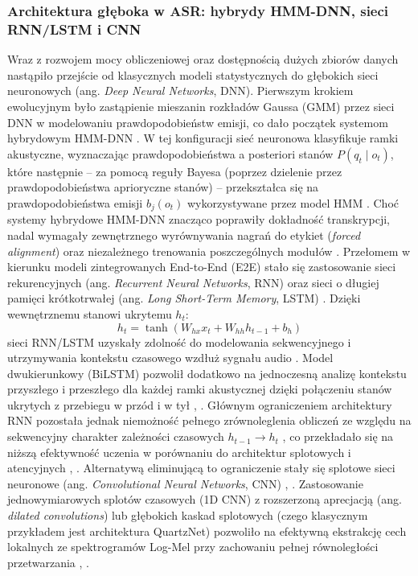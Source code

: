 \subsubsection{Architektura głęboka w ASR: hybrydy HMM-DNN, sieci RNN/LSTM i CNN}
Wraz z rozwojem mocy obliczeniowej oraz dostępnością dużych zbiorów danych nastąpiło przejście od klasycznych modeli statystycznych do głębokich sieci neuronowych (ang. \textit{Deep Neural Networks}, DNN). Pierwszym krokiem ewolucyjnym było zastąpienie mieszanin rozkładów Gaussa (GMM) przez sieci DNN w modelowaniu prawdopodobieństw emisji, co dało początek systemom hybrydowym HMM-DNN \cite[s.~20]{pudo2024optimizing}. W tej konfiguracji sieć neuronowa klasyfikuje ramki akustyczne, wyznaczając prawdopodobieństwa a posteriori stanów $P(q_t \mid o_t)$, które następnie – za pomocą reguły Bayesa (poprzez dzielenie przez prawdopodobieństwa aprioryczne stanów) – przekształca się na prawdopodobieństwa emisji $b_j(o_t)$ wykorzystywane przez model HMM \cite[s.~1, 1765]{graves2014towards}. Choć systemy hybrydowe HMM-DNN znacząco poprawiły dokładność transkrypcji, nadal wymagały zewnętrznego wyrównywania nagrań do etykiet (\textit{forced alignment}) oraz niezależnego trenowania poszczególnych modułów \cite[s.~316]{pondel2024e2e}. Przełomem w kierunku modeli zintegrowanych End-to-End (E2E) stało się zastosowanie sieci rekurencyjnych (ang. \textit{Recurrent Neural Networks}, RNN) oraz sieci o długiej pamięci krótkotrwałej (ang. \textit{Long Short-Term Memory}, LSTM) \cite[s.~316]{pondel2024e2e}. Dzięki wewnętrznemu stanowi ukrytemu $h_t$:
\begin{equation}
h_t = \tanh(W_{hx} x_t + W_{hh} h_{t-1} + b_h)
\end{equation}
sieci RNN/LSTM uzyskały zdolność do modelowania sekwencyjnego i utrzymywania kontekstu czasowego wzdłuż sygnału audio \cite[s.~1--3]{graves2014towards}. Model dwukierunkowy (BiLSTM) pozwolił dodatkowo na jednoczesną analizę kontekstu przyszłego i przeszłego dla każdej ramki akustycznej dzięki połączeniu stanów ukrytych z przebiegu w przód i w tył \cite[s.~2--3]{graves2014towards}, \cite[s.~313--314]{jurafsky2026}. Głównym ograniczeniem architektury RNN pozostała jednak niemożność pełnego zrównoleglenia obliczeń ze względu na sekwencyjny charakter zależności czasowych $h_{t-1} \to h_t$ \cite[s.~304--305]{jurafsky2026}, co przekładało się na niższą efektywność uczenia w porównaniu do architektur splotowych i atencyjnych \cite[s.~172]{jurafsky2026}, \cite[s.~1]{gulati2020conformer}. Alternatywą eliminującą to ograniczenie stały się splotowe sieci neuronowe (ang. \textit{Convolutional Neural Networks}, CNN) \cite[s.~360--363]{jurafsky2026}, \cite[s.~1]{gulati2020conformer}. Zastosowanie jednowymiarowych splotów czasowych (1D CNN) z rozszerzoną aprecjacją (ang. \textit{dilated convolutions}) lub głębokich kaskad splotowych (czego klasycznym przykładem jest architektura QuartzNet) pozwoliło na efektywną ekstrakcję cech lokalnych ze spektrogramów Log-Mel przy zachowaniu pełnej równoległości przetwarzania \cite[s.~360--363]{jurafsky2026}, \cite[s.~1, 4]{gulati2020conformer}.

